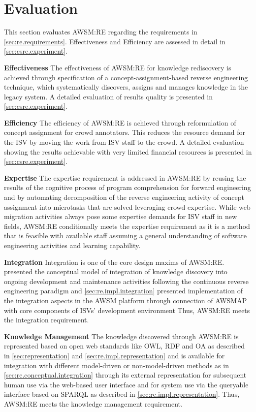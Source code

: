 \hypertarget{evaluation}{%
\section{Evaluation}\label{evaluation}}

This section evaluates AWSM:RE regarding the requirements in \cref{sec:re.requirements}.
Effectiveness and Efficiency are assessed in detail in \cref{sec:csre.experiment}.

\textbf{Effectiveness} The effectiveness of AWSM:RE for knowledge rediscovery is achieved through specification of a concept-assignment-based reverse engineering technique, which systematically discovers, assigns and manages knowledge in the legacy system.
A detailed evaluation of results quality is presented in \cref{sec:csre.experiment}.

\textbf{Efficiency} The efficiency of AWSM:RE is achieved through reformulation of concept assignment for crowd annotators.
This reduces the resource demand for the ISV by moving the work from ISV staff to the crowd.
A detailed evaluation showing the results achievable with very limited financial resources is presented in \cref{sec:csre.experiment}.

\textbf{Expertise} The expertise requirement is addressed in AWSM:RE by reusing the results of the cognitive process of program comprehension for forward engineering and by automating decomposition of the reverse engineering activity of concept assignment into microtasks that are solved leveraging crowd expertise.
While web migration activities always pose some expertise demands for ISV staff in new fields, AWSM:RE conditionally meets the expertise requirement as it is a method that is feasible with available staff assuming a general understanding of software engineering activities and learning capability.

\textbf{Integration} Integration is one of the core design maxims of AWSM:RE.
 presented the conceptual model of integration of knowledge discovery into ongoing development and maintenance activities following the continuous reverse engineering paradigm and \cref{sec:re.impl.integration} presented implementation of the integration aspects in the AWSM platform through connection of AWSMAP with core components of ISVs' development environment Thus, AWSM:RE meets the integration requirement.

\textbf{Knowledge Management} The knowledge discovered through AWSM:RE is represented based on open web standards like OWL, RDF and OA as described in \cref{sec:representation} and \cref{sec:re.impl.representation} and is available for integration with different model-driven or non-model-driven methods as in \cref{sec:re.conceptual.integration} through its external representation for subsequent human use via the web-based user interface and for system use via the queryable interface based on SPARQL as described in \cref{sec:re.impl.representation}.
Thus, AWSM:RE meets the knowledge management requirement.


